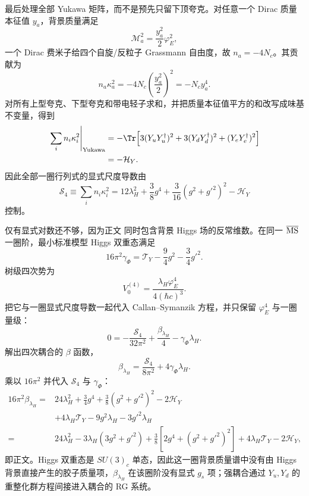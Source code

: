 \begin{derivation}
最后处理全部 Yukawa 矩阵，而不是预先只留下顶夸克。对任意一个 Dirac 质量本征值 $y_a$，背景质量满足
\begin{equation*}
 \mathcal M_a^2=\frac{y_a^2}{2}\varphi_E^2,
\end{equation*}
一个 Dirac 费米子给四个自旋/反粒子 Grassmann 自由度，故 $n_a=-4N_c$。其贡献为
\begin{equation*}
 n_a\kappa_a^2
 =-4N_c\left(\frac{y_a^2}{2}\right)^2
 =-N_cy_a^4.
\end{equation*}
对所有上型夸克、下型夸克和带电轻子求和，并把质量本征值平方的和改写成味基不变量，得到
\begin{align*}
 \left.\sum_i n_i \kappa_i^2\right|_{\rm Yukawa}
 &=-\Tr\!\left[3(Y_uY_u^\dagger)^2
 +3(Y_dY_d^\dagger)^2
 +(Y_eY_e^\dagger)^2\right]\\
 &=-\mathcal H_Y.
\end{align*}
因此全部一圈行列式的显式尺度导数由
\begin{equation*}
 \mathcal S_4
 \equiv\sum_i n_i \kappa_i^2
 =12\lambda_H^2
 +\frac38g^4
 +\frac{3}{16}(g^2+g'^2)^2
 -\mathcal H_Y
\end{equation*}
控制。

仅有显式对数还不够，因为正文 同时包含背景 Higgs 场的反常维数。在同一 $\overline{\rm MS}$ 一圈阶，最小标准模型 Higgs 双重态满足
\begin{equation*}
 16\pi^2\gamma_\Phi
 =\mathcal T_Y-\frac94g^2-\frac34g'^2.
\end{equation*}
树级四次势为
\begin{equation*}
 V_0^{(4)}
 =\frac{\lambda_H\varphi_E^4}{4(\hbar c)^3}.
\end{equation*}
把它与一圈显式尺度导数一起代入 Callan--Symanzik 方程，并只保留 $\varphi_E^4$ 与一圈量级：
\begin{equation*}
 0
 =-\frac{\mathcal S_4}{32\pi^2}
 +\frac{\beta_{\lambda_H}}4
 -\gamma_\Phi\lambda_H.
\end{equation*}
解出四次耦合的 $\beta$ 函数，
\begin{equation*}
 \beta_{\lambda_H}
 =\frac{\mathcal S_4}{8\pi^2}
 +4\gamma_\Phi\lambda_H.
\end{equation*}
乘以 $16\pi^2$ 并代入 $\mathcal S_4$ 与 $\gamma_\Phi$：
\begin{align*}
16\pi^2\beta_{\lambda_H}
={}&24\lambda_H^2
+\frac34g^4
+\frac38(g^2+g'^2)^2
-2\mathcal H_Y\\
&+4\lambda_H\mathcal T_Y
-9g^2\lambda_H-3g'^2\lambda_H\\
={}&24\lambda_H^2
-3\lambda_H(3g^2+g'^2)
+\frac38\left[2g^4+(g^2+g'^2)^2\right]
+4\lambda_H\mathcal T_Y-2\mathcal H_Y,
\end{align*}
即正文。Higgs 双重态是 $SU(3)_c$ 单态，因此这一圈背景质量谱中没有由 Higgs 背景直接产生的胶子质量项，$\beta_{\lambda_H}$ 在该圈阶没有显式 $g_s$ 项；强耦合通过 $Y_u,Y_d$ 的重整化群方程间接进入耦合的 RG 系统。
\end{derivation}

